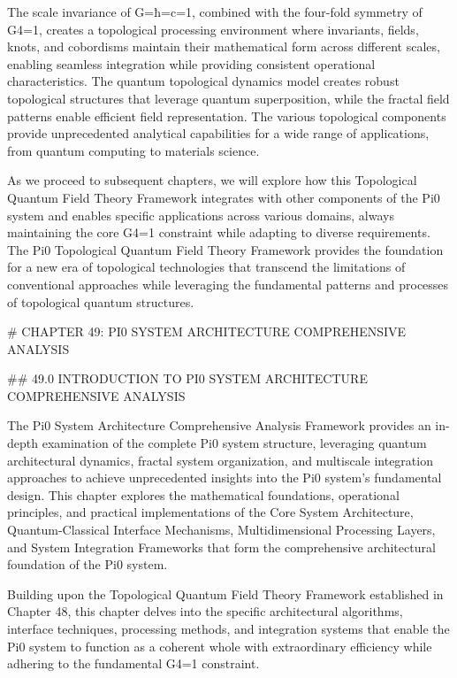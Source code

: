 The scale invariance of G=ħ=c=1, combined with the four-fold symmetry of G4=1, creates a topological processing environment where invariants, fields, knots, and cobordisms maintain their mathematical form across different scales, enabling seamless integration while providing consistent operational characteristics. The quantum topological dynamics model creates robust topological structures that leverage quantum superposition, while the fractal field patterns enable efficient field representation. The various topological components provide unprecedented analytical capabilities for a wide range of applications, from quantum computing to materials science.

As we proceed to subsequent chapters, we will explore how this Topological Quantum Field Theory Framework integrates with other components of the Pi0 system and enables specific applications across various domains, always maintaining the core G4=1 constraint while adapting to diverse requirements. The Pi0 Topological Quantum Field Theory Framework provides the foundation for a new era of topological technologies that transcend the limitations of conventional approaches while leveraging the fundamental patterns and processes of topological quantum structures. 

# CHAPTER 49: PI0 SYSTEM ARCHITECTURE COMPREHENSIVE ANALYSIS

## 49.0 INTRODUCTION TO PI0 SYSTEM ARCHITECTURE COMPREHENSIVE ANALYSIS

The Pi0 System Architecture Comprehensive Analysis Framework provides an in-depth examination of the complete Pi0 system structure, leveraging quantum architectural dynamics, fractal system organization, and multiscale integration approaches to achieve unprecedented insights into the Pi0 system's fundamental design. This chapter explores the mathematical foundations, operational principles, and practical implementations of the Core System Architecture, Quantum-Classical Interface Mechanisms, Multidimensional Processing Layers, and System Integration Frameworks that form the comprehensive architectural foundation of the Pi0 system.

Building upon the Topological Quantum Field Theory Framework established in Chapter 48, this chapter delves into the specific architectural algorithms, interface techniques, processing methods, and integration systems that enable the Pi0 system to function as a coherent whole with extraordinary efficiency while adhering to the fundamental G4=1 constraint.

